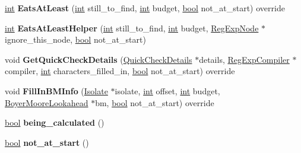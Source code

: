 \begin{DoxyCompactItemize}
\mbox{\hyperlink{classint}{int}} {\bfseries Eats\+At\+Least} (\mbox{\hyperlink{classint}{int}} still\+\_\+to\+\_\+find, \mbox{\hyperlink{classint}{int}} budget, \mbox{\hyperlink{classbool}{bool}} not\+\_\+at\+\_\+start) override
\item 
\mbox{\label{classv8_1_1internal_1_1ChoiceNode_afcd5ff9141d54e2d163a60a66cb3abbd}} 
\mbox{\hyperlink{classint}{int}} {\bfseries Eats\+At\+Least\+Helper} (\mbox{\hyperlink{classint}{int}} still\+\_\+to\+\_\+find, \mbox{\hyperlink{classint}{int}} budget, \mbox{\hyperlink{classv8_1_1internal_1_1RegExpNode}{Reg\+Exp\+Node}} $\ast$ignore\+\_\+this\+\_\+node, \mbox{\hyperlink{classbool}{bool}} not\+\_\+at\+\_\+start)
\item 
\mbox{\label{classv8_1_1internal_1_1ChoiceNode_a7e02f61adeacbaa83053799ddc1d6781}} 
void {\bfseries Get\+Quick\+Check\+Details} (\mbox{\hyperlink{classv8_1_1internal_1_1QuickCheckDetails}{Quick\+Check\+Details}} $\ast$details, \mbox{\hyperlink{classv8_1_1internal_1_1RegExpCompiler}{Reg\+Exp\+Compiler}} $\ast$compiler, \mbox{\hyperlink{classint}{int}} characters\+\_\+filled\+\_\+in, \mbox{\hyperlink{classbool}{bool}} not\+\_\+at\+\_\+start) override
\item 
\mbox{\label{classv8_1_1internal_1_1ChoiceNode_a76e6061c827e68d87c885a71455eaffc}} 
void {\bfseries Fill\+In\+B\+M\+Info} (\mbox{\hyperlink{classv8_1_1internal_1_1Isolate}{Isolate}} $\ast$isolate, \mbox{\hyperlink{classint}{int}} offset, \mbox{\hyperlink{classint}{int}} budget, \mbox{\hyperlink{classv8_1_1internal_1_1BoyerMooreLookahead}{Boyer\+Moore\+Lookahead}} $\ast$bm, \mbox{\hyperlink{classbool}{bool}} not\+\_\+at\+\_\+start) override
\item 
\mbox{\label{classv8_1_1internal_1_1ChoiceNode_a424ff01754676f5bac9b7e5356332dc3}} 
\mbox{\hyperlink{classbool}{bool}} {\bfseries being\+\_\+calculated} ()
\item 
\mbox{\label{classv8_1_1internal_1_1ChoiceNode_ac196fd8c0df4d1676a23fed33ad460c6}} 
\mbox{\hyperlink{classbool}{bool}} {\bfseries not\+\_\+at\+\_\+start} ()
\item 
\mbox{\label{classv8_1_1internal_1_1ChoiceNode_a43edce21f575aebdb5417794138043be}} 

\end{DoxyCompactItemize}
